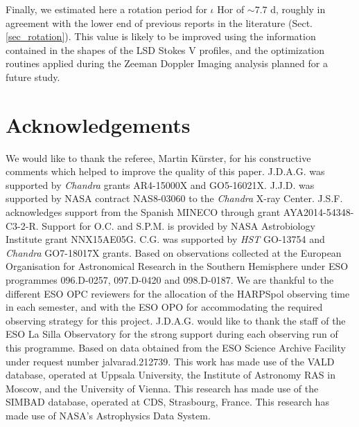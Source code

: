\documentclass[a4paper,fleqn,usenatbib]{mnras}
\begin{document}

Finally, we estimated here a rotation period for $\iota$ Hor of $\sim$$7.7$ d, roughly in agreement with the lower end of previous reports in the literature (Sect. \ref{sec_rotation}). This value is likely to be improved using the information contained in the shapes of the LSD Stokes V profiles, and the optimization routines applied during the Zeeman Doppler Imaging analysis planned for a future study.


\section*{Acknowledgements}

We would like to thank the referee, Martin K\"urster, for his constructive comments which helped to improve the quality of this paper. J.D.A.G. was supported by \textit{Chandra} grants AR4-15000X and GO5-16021X. J.J.D. was supported by NASA contract NAS8-03060 to the \textit{Chandra} X-ray Center. J.S.F. acknowledges support from the Spanish MINECO through grant AYA2014-54348-C3-2-R. Support for O.C. and S.P.M. is provided by NASA Astrobiology Institute grant NNX15AE05G. C.G. was supported by \textit{HST} GO-13754 and \textit{Chandra} GO7-18017X grants. Based on observations collected at the European Organisation for Astronomical Research in the Southern Hemisphere under ESO programmes 096.D-0257, 097.D-0420 and 098.D-0187. We are thankful to the different ESO OPC reviewers for the allocation of the HARPSpol observing time in each semester, and with the ESO OPO for accommodating the required observing strategy for this project. J.D.A.G. would like to thank the staff of the ESO La Silla Observatory for the strong support during each observing run of this programme. Based on data obtained from the ESO Science Archive Facility under request number jalvarad.212739. This work has made use of the VALD database, operated at Uppsala University, the Institute of Astronomy RAS in Moscow, and the University of Vienna. This research has made use of the SIMBAD database, operated at CDS, Strasbourg, France. This research has made use of NASA's Astrophysics Data System. %
\end{document}

